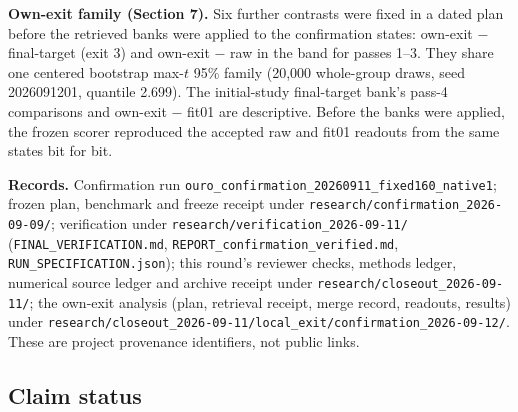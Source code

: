 \textbf{Own-exit family (Section 7).} Six further contrasts were fixed
in a dated plan before the retrieved banks were applied to the
confirmation states: own-exit − final-target (exit 3) and own-exit − raw
in the band for passes 1--3. They share one centered bootstrap max-\(t\)
95\% family (20,000 whole-group draws, seed 2026091201, quantile 2.699).
The initial-study final-target bank's pass-4 comparisons and own-exit −
fit01 are descriptive. Before the banks were applied, the frozen scorer
reproduced the accepted raw and fit01 readouts from the same states bit
for bit.

\textbf{Records.} Confirmation run
\texttt{ouro\_confirmation\_20260911\_fixed160\_native1}; frozen plan,
benchmark and freeze receipt under
\texttt{research/confirmation\_2026-09-09/}; verification under
\texttt{research/verification\_2026-09-11/}
(\texttt{FINAL\_VERIFICATION.md},
\texttt{REPORT\_confirmation\_verified.md},
\texttt{RUN\_SPECIFICATION.json}); this round's reviewer checks, methods
ledger, numerical source ledger and archive receipt under
\texttt{research/closeout\_2026-09-11/}; the own-exit analysis (plan,
retrieval receipt, merge record, readouts, results) under
\texttt{research/closeout\_2026-09-11/local\_exit/confirmation\_2026-09-12/}.
These are project provenance identifiers, not public links.

\subsection{Claim status}\label{claim-status}

